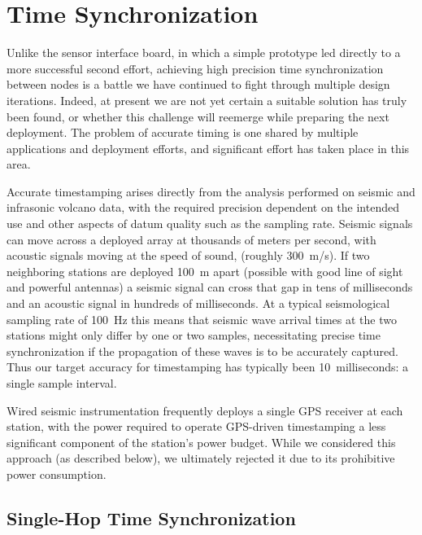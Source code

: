 \section{Time Synchronization}
\label{sec-timesynchronization}
\label{subsec-multihoptimesync}

Unlike the sensor interface board, in which a simple prototype led directly
to a more successful second effort, achieving high precision time
synchronization between nodes is a battle we have continued to fight through
multiple design iterations.  Indeed, at present we are not yet certain a
suitable solution has truly been found, or whether this challenge will
reemerge while preparing the next deployment.  The problem of accurate timing
is one shared by multiple applications and deployment efforts, and
significant effort has taken place in this area.

Accurate timestamping arises directly from the analysis performed on seismic
and infrasonic volcano data, with the required precision dependent on the
intended use and other aspects of datum quality such as the sampling rate.
Seismic signals can move across a deployed array at thousands of meters per
second, with acoustic signals moving at the speed of sound, (roughly
300~m/s). If two neighboring stations are deployed 100~m apart (possible with
good line of sight and powerful antennas) a seismic signal can cross that gap
in tens of milliseconds and an acoustic signal in hundreds of milliseconds. At
a typical seismological sampling rate of 100~Hz this means that seismic wave
arrival times at the two stations might only differ by one or two samples,
necessitating precise time synchronization if the propagation of these waves
is to be accurately captured.  Thus our target accuracy for timestamping has
typically been 10~milliseconds: a single sample interval.

Wired seismic instrumentation frequently deploys a single GPS receiver at
each station, with the power required to operate GPS-driven timestamping a
less significant component of the station's power budget. While we considered
this approach (as described below), we ultimately rejected it due to its
prohibitive power consumption.

\subsection{Single-Hop Time Synchronization}

